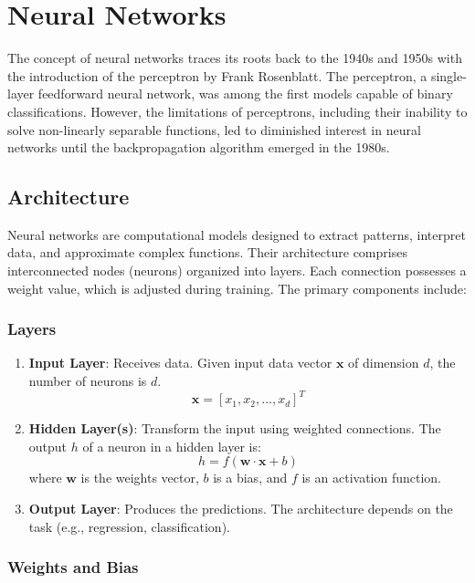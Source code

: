 \section{Neural Networks}
The concept of neural networks traces its roots back to the 1940s and 1950s with the introduction of the perceptron by Frank Rosenblatt. The perceptron, a single-layer feedforward neural network, was among the first models capable of binary classifications. However, the limitations of perceptrons, including their inability to solve non-linearly separable functions, led to diminished interest in neural networks until the backpropagation algorithm emerged in the 1980s.

\subsection{Architecture}

Neural networks are computational models designed to extract patterns, interpret data, and approximate complex functions. Their architecture comprises interconnected nodes (neurons) organized into layers. Each connection possesses a weight value, which is adjusted during training. The primary components include:

\subsubsection{Layers}

\begin{enumerate}
	\item \textbf{Input Layer}: Receives data. Given input data vector \( \mathbf{x} \) of dimension \( d \), the number of neurons is \( d \).
	\[
	\mathbf{x} = [x_1, x_2, ..., x_d]^T
	\]
	
	\item \textbf{Hidden Layer(s)}: Transform the input using weighted connections. The output \( h \) of a neuron in a hidden layer is:
	\[
	h = f(\mathbf{w} \cdot \mathbf{x} + b)
	\]
	where \( \mathbf{w} \) is the weights vector, \( b \) is a bias, and \( f \) is an activation function.
	
	\item \textbf{Output Layer}: Produces the predictions. The architecture depends on the task (e.g., regression, classification).
\end{enumerate}

\subsubsection{Weights and Bias}

